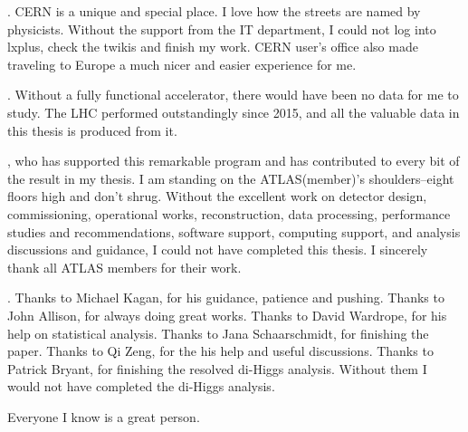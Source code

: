 . CERN is a unique and special place. I love how the streets are named by physicists. Without the support from the IT department, I could not log into lxplus, check the twikis and finish my work. CERN user's office also made traveling to Europe a much nicer and easier experience for me. 

. Without a fully functional accelerator, there would have been no data for me to study. The LHC performed outstandingly since 2015, and all the valuable data in this thesis is produced from it. 

, who has supported this remarkable program and has contributed to every bit of the result in my thesis. I am standing on the ATLAS(member)'s shoulders--eight floors high and don't shrug. Without the excellent work on detector design, commissioning, operational works, reconstruction, data processing, performance studies and recommendations, software support, computing support, and analysis discussions and guidance, I could not have completed this thesis. I sincerely thank all ATLAS members for their work.



. Thanks to Michael Kagan, for his guidance, patience and pushing. Thanks to John Allison, for always doing great works. Thanks to David Wardrope, for his help on statistical analysis. Thanks to Jana Schaarschmidt, for finishing the paper. Thanks to Qi Zeng, for the his help and useful discussions. Thanks to Patrick Bryant, for finishing the resolved di-Higgs analysis. Without them I would not have completed the di-Higgs analysis.

 Everyone I know is a great person.  

